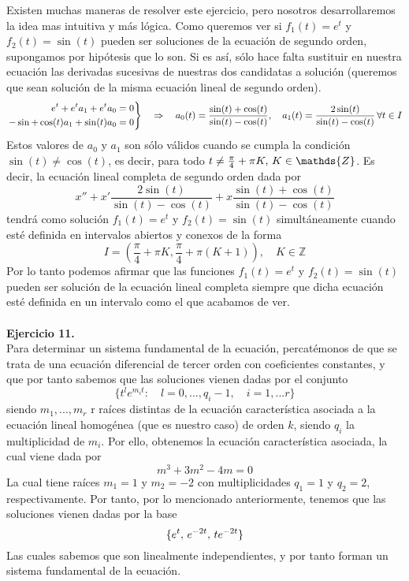 \documentclass[fleqn]{article}
\def\Z{\mathds{Z}}
\begin{document}
Existen muchas maneras de resolver este ejercicio, pero nosotros desarrollaremos la idea mas intuitiva y más lógica. Como queremos ver si $f_1(t) = e^t$ y $f_2(t)=\sin (t)$
pueden ser soluciones de la ecuación de segundo orden, supongamos por hipótesis que lo son. Si es así, sólo hace falta sustituir en nuestra ecuación 
las derivadas sucesivas de nuestras dos candidatas a solución (queremos que sean solución de la misma ecuación lineal de segundo orden).
\begin{equation*}
    \left.
    \begin{aligned}
        e^t + e^ta_1 + e^t a_0 = 0 \\
        -\sin + \cos(t)a_1 + \sin(t)a_0=0
    \end{aligned}
    \right\} \quad \Rightarrow \quad a_0(t)=\frac{\sin(t) + \cos(t)}{\sin(t) - \cos(t)}, \quad a_1(t)=\frac{2\sin(t)}{\sin(t) - \cos(t)} \thinspace \forall t \in I
\end{equation*}
Estos valores de $a_0$ y $a_1$ son sólo válidos cuando se cumpla la condición $\sin(t) \neq \cos(t)$, es decir, para todo $t \neq \frac{\pi}{4} + \pi K, \thinspace K \in \Z$.
Es decir, la ecuación lineal completa de segundo orden dada por 
$$x'' + x'\frac{2\sin(t)}{\sin(t) - \cos(t)} + x\frac{\sin(t) + \cos(t)}{\sin(t) - \cos(t)}$$
tendrá como solución $f_1(t) = e^t$ y $f_2(t)=\sin (t)$ simultáneamente cuando esté definida en intervalos abiertos y conexos de la forma 
$$I = \left(\frac{\pi}{4} + \pi K, \frac{\pi}{4} + \pi (K+1)\right), \quad K \in \Z$$
Por lo tanto podemos afirmar que las funciones $f_1(t) = e^t$ y $f_2(t)=\sin (t)$ pueden ser solución de la ecuación lineal completa siempre que dicha ecuación
esté definida en un intervalo como el que acabamos de ver.\\ \\

\textbf{Ejercicio 11.} \\

Para determinar un sistema fundamental de la ecuación, percatémonos de que se trata de una ecuación diferencial de tercer orden con coeficientes constantes,
y que por tanto sabemos que las soluciones vienen dadas por el conjunto
$$\{t^le^{m_it}: \quad l=0,...,q_i-1, \quad i=1,...r\}$$
siendo $m_1,...,m_r$ r raíces distintas de la ecuación característica asociada a la ecuación lineal homogénea (que es nuestro caso) de orden $k$, siendo 
$q_i$ la multiplicidad de $m_i$. Por ello, obtenemos la ecuación característica asociada, la cual viene dada por 
$$m^3 + 3m^2 -4m = 0$$
La cual tiene raíces $m_1 = 1$ y $m_2 = -2$ con multiplicidades $q_1 = 1$ y $q_2 = 2$, respectivamente. Por tanto, por lo mencionado anteriormente, tenemos
que las soluciones vienen dadas por la base 
$$\{e^t, \thinspace e^{-2t}, \thinspace te^{-2t}\}$$
Las cuales sabemos que son linealmente independientes, y por tanto forman un sistema fundamental de la ecuación.
\end{document}
